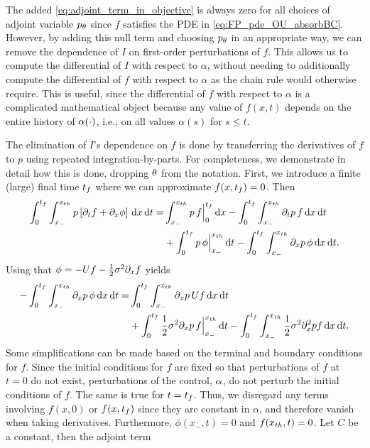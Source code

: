The added \cref{eq:adjoint_term_in_objective} is always zero for all
choices of adjoint variable $p_{ \theta}$ 
since $f$ satisfies the PDE in \cref{eq:FP_pde_OU_absorbBC}. However,
by adding this null term and choosing $p_{ \theta}$ in an appropriate way,
we can
remove the dependence of $I$ on first-order perturbations of $f$. This allows
us to compute the differential of $I$ with respect to $\alpha$, without needing
to additionally compute the differential of $f$ with respect to $\alpha$ as the
chain rule would otherwise require. This is useful, since the
differential of $f$ with respect to $\alpha$ is a complicated mathematical
object because any value of $f(x,t)$ depends on the entire history of
$\alpha(\cdot)$, i.e., on all values $\alpha(s)$ for $s\leq t$.

The elimination of $I$'s dependence on $f$ is done by transferring the
derivatives of $f$ to $p$ using repeated integration-by-parts. For completeness,
we demonstrate in detail how this is done, dropping ${ \theta}$ from the
notation. First, we introduce a finite (large) final time ${ t_f }$
where we can approximate $f(x,{ t_f })=0$. Then
\begin{align*}
\int_0^{{ t_f }} \int_{x_-}^{{ x_{th} }}
p  \left[{\partial}_t f  + {\partial}_x \phi\right]
	\, \mathrm{d} x\, \mathrm{d} t 
=& 
\int_{x_-}^{{ x_{th} }} p \, f \Big|_0^{{ t_f }} \, \mathrm{d} x -
\int_0^{{ t_f }}\int_{x_-}^{{ x_{th} }} {\partial}_tp \,  f \, \mathrm{d} x\, \mathrm{d} t  
\\
&+ \int_{0}^{{ t_f }} p\, \phi   \Big|_{x_-}^{{ x_{th} }} \, \mathrm{d} t
-  \int_0^{{ t_f }}\int_{x_-}^{{ x_{th} }} {\partial}_xp \,  \phi
\, \mathrm{d} x\, \mathrm{d} t.
\end{align*}
Using that $\phi = -Uf-\frac12 \sigma^2 {\partial}_xf$ yields
\begin{align*}
-  \int_0^{{ t_f }}\int_{x_-}^{{ x_{th} }} {\partial}_xp \,  \phi
\, \mathrm{d} x\, \mathrm{d} t
=&
 \int_0^{{ t_f }}\int_{x_-}^{{ x_{th} }} {\partial}_xp \,  U f\, \mathrm{d} x\, \mathrm{d} t
\\
&+  
\int_{0}^{{ t_f }} \frac{1 }{2}\sigma^2{\partial}_xp\, f \Big|_{x_-}^{{ x_{th} }} \, \mathrm{d} t -
\int_0^{{ t_f }}\int_{x_-}^{{ x_{th} }} \frac{1 }{2}\sigma^2{\partial}^2_xp   f\, \mathrm{d} x\, \mathrm{d} t.
\end{align*}
Some simplifications can be made based on the terminal and boundary
conditions for $f$. Since the initial conditions for $f$ are fixed so that perturbations of
  $f$ at $t=0$ do not exist, perturbations of the  control, $\alpha$,
  do not perturb the initial conditions of $f$. The same is true for $t={ t_f }$. Thus, we disregard any
  terms involving $f(x,0)$ or $f(x,{ t_f })$ since they are constant in
  $\alpha$, and therefore vanish when taking derivatives. Furthermore, $\phi(x_-, t)=0$ and
  $f({ x_{th} }, t) = 0$. Let $C$ be a constant, then the adjoint term
